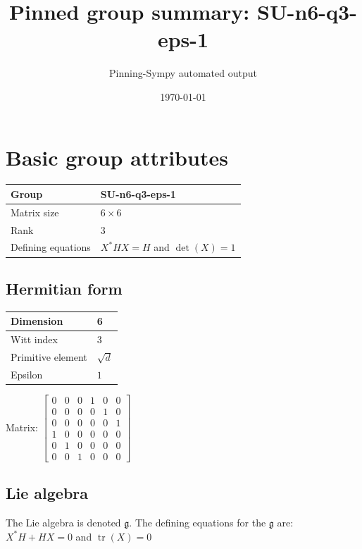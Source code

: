 \documentclass[11pt]{article}
\title{Pinned group summary: SU-n6-q3-eps-1}
\author{Pinning-Sympy automated output}
\date{\today}
\newcommand{\frakg}{\mathfrak{g}}
\theoremstyle{definition}
\begin{document}
\maketitle
\tableofcontents

\newpage

\section{Basic group attributes}

\def\arraystretch{1.2}
\begin{tabular}{|l|l|}
	\hline
    Group & SU-n6-q3-eps-1 \\
	\hline
    Matrix size & $6 \times 6$ \\
	\hline
    Rank & $3$ \\
	\hline
	Defining equations & $X^*HX=H$ and $\operatorname{det}(X)=1$ \\
	\hline
\end{tabular}
\def\arraystretch{1}

\subsection{Hermitian form}
\begin{tabular}{|l|l|}
    \hline
    Dimension & 6 \\
    \hline
    Witt index & 3 \\
    \hline
    Primitive element & $\sqrt{d}$ \\
    \hline
    Epsilon & $1$ \\
    \hline
\end{tabular}

\bigskip
\noindent Matrix: \(
\left[\begin{matrix}0 & 0 & 0 & 1 & 0 & 0\\0 & 0 & 0 & 0 & 1 & 0\\0 & 0 & 0 & 0 & 0 & 1\\1 & 0 & 0 & 0 & 0 & 0\\0 & 1 & 0 & 0 & 0 & 0\\0 & 0 & 1 & 0 & 0 & 0\end{matrix}\right]
\)



\subsection{Lie algebra}

The Lie algebra is denoted $\frakg$. The defining equations for the $\frakg$ are: $X^*H + HX=0$ and $\operatorname{tr}(X)=0$
\end{document}
